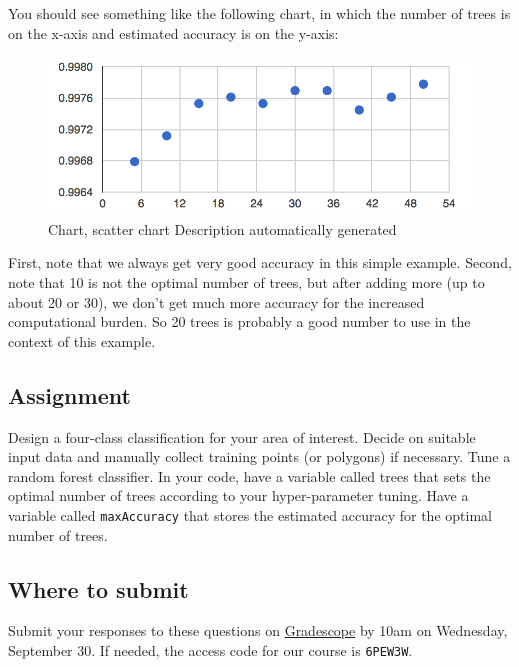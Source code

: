 \documentclass[
]{article}
\begin{document}
You should see something like the following chart, in which the number of trees is on the x-axis and estimated accuracy is on the y-axis:

\begin{figure}
\centering
\includegraphics{./im/im_05_01.png}
\caption{Chart, scatter chart Description automatically generated}
\end{figure}

First, note that we always get very good accuracy in this simple example. Second, note that 10 is not the optimal number of trees, but after adding more (up to about 20 or 30), we don't get much more accuracy for the increased computational burden. So 20 trees is probably a good number to use in the context of this example.

\hypertarget{assignment}{%
\subsection{Assignment}\label{assignment}}

Design a four-class classification for your area of interest. Decide on suitable input data and manually collect training points (or polygons) if necessary. Tune a random forest classifier. In your code, have a variable called trees that sets the optimal number of trees according to your hyper-parameter tuning. Have a variable called \texttt{maxAccuracy} that stores the estimated accuracy for the optimal number of trees.

\hypertarget{where-to-submit-3}{%
\subsection*{Where to submit}\label{where-to-submit-3}}

Submit your responses to these questions on \href{https://www.gradescope.com/courses/293173/assignments/1446622/submissions}{Gradescope} by 10am on Wednesday, September 30. If needed, the access code for our course is \texttt{6PEW3W}.
\end{document}
